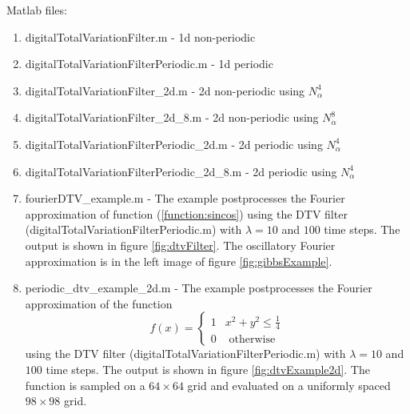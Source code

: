 \documentclass[12pt]{article}
\begin{document}
Matlab files:
\begin{enumerate}
  \item digitalTotalVariationFilter.m - 1d non-periodic
  \item digitalTotalVariationFilterPeriodic.m - 1d periodic
  \item digitalTotalVariationFilter\_2d.m - 2d non-periodic using $N_\alpha^4$
  \item digitalTotalVariationFilter\_2d\_8.m - 2d non-periodic using $N_\alpha^8$
  \item digitalTotalVariationFilterPeriodic\_2d.m - 2d periodic using $N_\alpha^4$
  \item digitalTotalVariationFilterPeriodic\_2d\_8.m - 2d periodic using $N_\alpha^4$
  \item fourierDTV\_example.m - The example postprocesses the Fourier approximation of function (\ref{function:sincos})
  using the DTV filter (digitalTotalVariationFilterPeriodic.m) with $\lambda = 10$ and $100$ time steps.  The output is shown in figure \ref{fig:dtvFilter}. The oscillatory Fourier approximation is in
   the left image of figure \ref{fig:gibbsExample}.
  \item periodic\_dtv\_example\_2d.m - The example postprocesses the Fourier approximation of the function
\begin{equation}
 f(x)= \left\{
\begin{array}{ll}
  1 & x^2 + y^2 \leq \frac{1}{4} \\
  0 & \mbox{ otherwise }
\end{array}
\right. \label{function:circle2d}
\end{equation}
   using the DTV filter (digitalTotalVariationFilterPeriodic.m) with $\lambda = 10$ and $100$ time steps.  The output is shown in figure \ref{fig:dtvExample2d}.  The function is sampled on a $64 \times 64$ grid and evaluated on a uniformly spaced $98 \times 98$ grid.
\end{enumerate}
\end{document}
